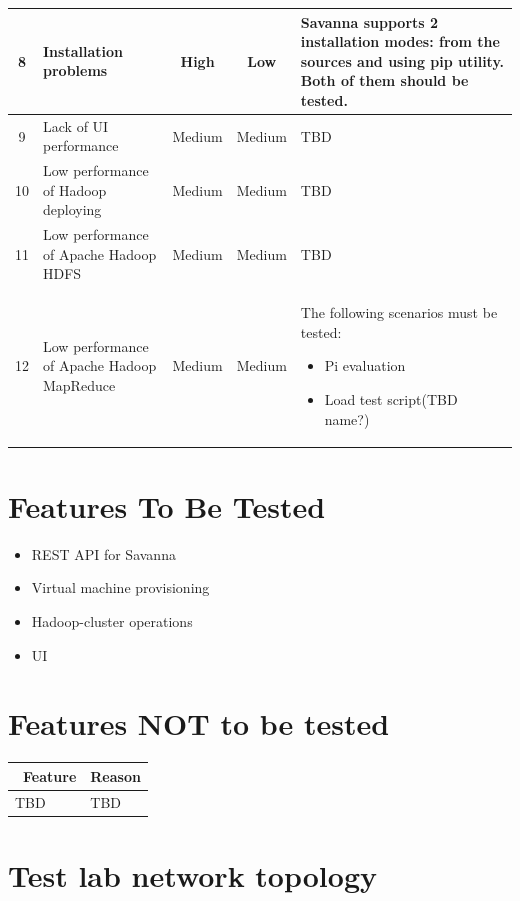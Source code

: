 \documentclass[a4paper,11pt]{article}
\begin{document}
\begin{longtable}{|c|p{3cm}|c|c|p{8cm}|}
8&Installation problems& High &  Low & Savanna supports 2 installation modes: from the sources and using pip utility. Both of them should be tested.\\ \hline
9&Lack of UI performance & Medium & Medium & TBD \\ \hline
10&Low performance of Hadoop deploying & Medium & Medium & TBD\\ \hline
11&Low performance of Apache Hadoop HDFS & Medium & Medium & TBD\\ \hline
12&Low performance of Apache Hadoop MapReduce & Medium & Medium & The following scenarios must be tested:
\begin{itemize}
\item Pi evaluation
\item Load test script(TBD name?)
\end{itemize}
\\ \hline
\end{longtable}

\section{Features To Be Tested}
\begin{itemize}
\item REST API for Savanna
\item Virtual machine provisioning 
\item Hadoop-cluster operations
\item UI
 
\end{itemize} 

\section{Features NOT to be tested}
\begin{tabular}{|p{5cm}|p{10cm}|}
\hline
\ \bf Feature & \bf Reason \\ \hline
TBD&TBD \\ \hline
\end{tabular}


\newpage
\section{Test lab network topology}
\end{document}
